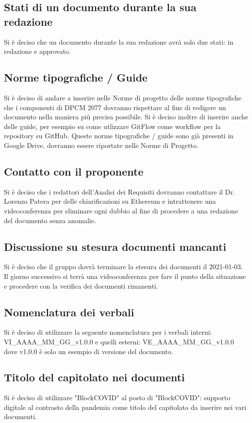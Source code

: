 \subsection*{Stati di un documento durante la sua redazione}
Si è deciso che un documento durante la sua redazione avrà solo due stati: in redazione e approvato.

\subsection*{Norme tipografiche / Guide}
Si è deciso di andare a inserire nelle Norme di progetto delle norme tipografiche che i componenti di DPCM 2077 dovranno rispettare al fine di redigere un documento nella maniera
più precisa possibile. Si è deciso inoltre di inserire anche delle guide, per esempio su come utlizzare GitFlow come workflow per la repository su GitHub.
Queste norme tipografiche / guide sono già presenti in Google Drive, dovranno essere riportate nelle Norme di Progetto.

\subsection*{Contatto con il proponente}
Si è deciso che i redattori dell'Analisi dei Requisiti dovranno contattare il Dr. Lorenzo Patera per delle chiarificazioni su Ethereum e intrattenere una videoconferenza per eliminare ogni dubbio
al fine di procedere a una redazione del documento senza anomalie.

\subsection*{Discussione su stesura documenti mancanti}
Si è deciso che il gruppo dovrà terminare la stesura dei documenti il 2021-01-03. Il giorno successivo si terrà una videoconferenza per fare il punto della situazione e procedere con la verifica dei documenti rimanenti.

\subsection*{Nomenclatura dei verbali}
Si è deciso di utilizzare la seguente nomenclatura per i verbali interni: VI\_AAAA\_MM\_GG\_v1.0.0 e quelli esterni:  VE\_AAAA\_MM\_GG\_v1.0.0 dove v1.0.0 è solo un esempio di versione del documento.

\subsection*{Titolo del capitolato nei documenti}
Si è deciso di utilizzare "BlockCOVID" al posto di "BlockCOVID": supporto digitale al contrasto della pandemia come titolo del capitolato da inserire nei vari documenti.

